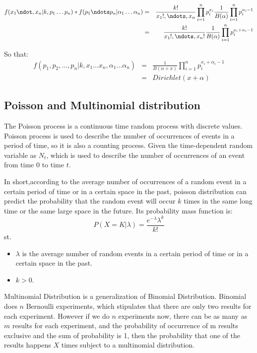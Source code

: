 \begin{eqnarray*}
  f(x_1\ndot,x_n|k,p_1\dots p_n)*f(p_1 \ndots p_n|\alpha_1 \dots \alpha_n) &=& \frac{k!}{x_1!,\ndots,x_n} \prod_{i=1}^n p_i^{x_i} \frac{1}{B(\alpha)} \prod_{i=1}^n p_i^{\alpha_i-1} \\
  &=& \frac{k!}{x_1!,\ndots,x_n!}  \frac{1}{B(\alpha)} \prod_{i=1}^n p_i^{x_i + \alpha_i-1} \\
\end{eqnarray*}

So that:
\begin{eqnarray*}
f(p_1,p_2,\dots,p_n|k,x_1 \dots x_n,\alpha_1 \dots \alpha_n) &=& \frac{1}{B(\alpha + x)} \prod_{i=1}^n p_i^{x_i + \alpha_i-1}\\
  &=& Dirichlet(x + \alpha)
\end{eqnarray*}







\subsection{Poisson and Multinomial distribution}

The Poisson process is a continuous time random process with discrete values. Poisson process is used to describe the number of occurrences of events in a period of time, so it is also a counting process. Given the time-dependent random variable as $N_t$, which is used to describe the number of occurrences of an event from time 0 to time $t$.


In short,according to the average number of occurrences of a random event in a certain period of time or in a certain space in the past, poisson distribution can predict the probability that the random event will occur $k$ times in the same long time or the same large space in the future. Its probability mass function is:
\[
  P(X=K|\lambda) = \frac{e^{-\lambda} \lambda^k}{k!}
\]
st.
\begin{itemize}
  \item
$\lambda$ is the average number of random events in a certain period of time or in a certain space in the past.
\item$ k>0$.
\end{itemize}


Multinomial Distribution is a generalization of Binomial Distribution. Binomial does $n$ Bernoulli experiments, which stipulates that there are only two results for each experiment. However if we do $n$ experiments now, there can be as many as $m$ results for each experiment, and the probability of occurrence of m results exclusive and the sum of probability is 1, then the probability that one of the results happens $X$ times subject to  a multinomial distribution.


